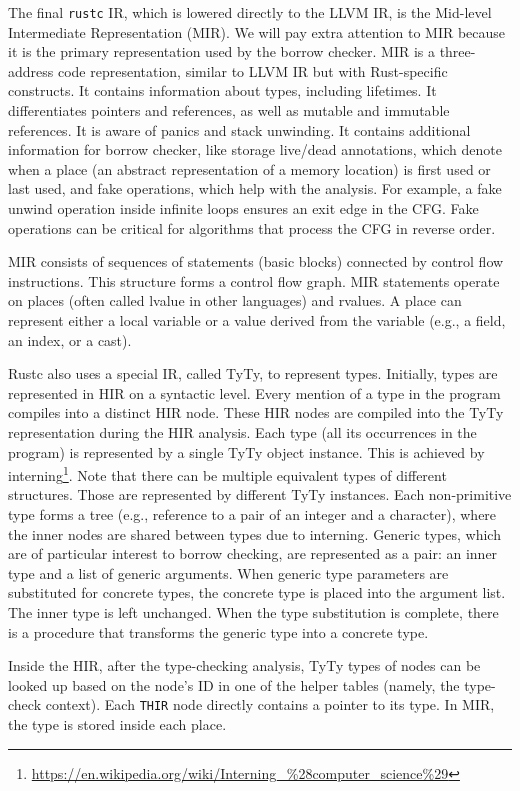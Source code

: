 \documentclass[
  11pt,
  twoside]{report}
\DeclareRobustCommand{\href}[2]{#2\footnote{\url{#1}}}
\begin{document}
The final \texttt{rustc} IR, which is lowered directly to the LLVM IR,
is the Mid-level Intermediate Representation (MIR). We will pay extra
attention to MIR because it is the primary representation used by the
borrow checker. MIR is a three-address code representation, similar to
LLVM IR but with Rust-specific constructs. It contains information about
types, including lifetimes. It differentiates pointers and references,
as well as mutable and immutable references. It is aware of panics and
stack unwinding. It contains additional information for borrow checker,
like storage live/dead annotations, which denote when a place (an
abstract representation of a memory location) is first used or last
used, and fake operations, which help with the analysis. For example, a
fake unwind operation inside infinite loops ensures an exit edge in the
CFG. Fake operations can be critical for algorithms that process the CFG
in reverse order.

MIR consists of sequences of statements (basic blocks) connected by
control flow instructions. This structure forms a control flow graph.
MIR statements operate on places (often called lvalue in other
languages) and rvalues. A place can represent either a local variable or
a value derived from the variable (e.g., a field, an index, or a cast).

Rustc also uses a special IR, called TyTy, to represent types.
Initially, types are represented in HIR on a syntactic level. Every
mention of a type in the program compiles into a distinct HIR node.
These HIR nodes are compiled into the TyTy representation during the HIR
analysis. Each type (all its occurrences in the program) is represented
by a single TyTy object instance. This is achieved by
\href{https://en.wikipedia.org/wiki/Interning_\%28computer_science\%29}{interning}.
Note that there can be multiple equivalent types of different
structures. Those are represented by different TyTy instances. Each
non-primitive type forms a tree (e.g., reference to a pair of an integer
and a character), where the inner nodes are shared between types due to
interning. Generic types, which are of particular interest to borrow
checking, are represented as a pair: an inner type and a list of generic
arguments. When generic type parameters are substituted for concrete
types, the concrete type is placed into the argument list. The inner
type is left unchanged. When the type substitution is complete, there is
a procedure that transforms the generic type into a concrete type.

Inside the HIR, after the type-checking analysis, TyTy types of nodes
can be looked up based on the node's ID in one of the helper tables
(namely, the type-check context). Each \texttt{THIR} node directly
contains a pointer to its type. In MIR, the type is stored inside each
place.
\end{document}
